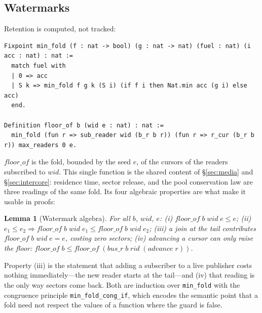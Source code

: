 \documentclass[10pt,journal,compsoc,twocolumn]{article}
\newtheorem{lemma}[theorem]{Lemma}
\theoremstyle{definition}
\theoremstyle{remark}
\theoremstyle{plain}
\newcommand{\ctr}[1]{\texttt{#1}}
\begin{document}
\subsection{Watermarks}
\label{sec:watermark}
Retention is computed, not tracked:
\begin{lstlisting}[language=Coq]
Fixpoint min_fold (f : nat -> bool) (g : nat -> nat) (fuel : nat) (i acc : nat) : nat :=
  match fuel with
  | 0 => acc
  | S k => min_fold f g k (S i) (if f i then Nat.min acc (g i) else acc)
  end.

Definition floor_of b (wid e : nat) : nat :=
  min_fold (fun r => sub_reader wid (b_r b r)) (fun r => r_cur (b_r b r)) max_readers 0 e.
\end{lstlisting}
\(\mathit{floor\_of}\) is the fold, bounded by the seed \(e\), of the cursors of the readers subscribed to \(\mathit{wid}\). This single function is the shared content of \S\ref{sec:media} and \S\ref{sec:intercore}: residence time, sector release, and the pool conservation law are three readings of the same fold. Its four algebraic properties are what make it usable in proofs:
\begin{lemma}[Watermark algebra]
\label{lem:watermark}
For all \(b\), \(\mathit{wid}\), \(e\):
\textup{(i)} \(\mathit{floor\_of}\;b\;\mathit{wid}\;e \le e\);
\textup{(ii)} \(e_1 \le e_2 \Rightarrow \mathit{floor\_of}\;b\;\mathit{wid}\;e_1 \le \mathit{floor\_of}\;b\;\mathit{wid}\;e_2\);
\textup{(iii)} a join at the tail contributes \(\mathit{floor\_of}\;b\;\mathit{wid}\;e = e\), costing zero sectors;
\textup{(iv)} advancing a cursor can only raise the floor: \(\mathit{floor\_of}\;b \le \mathit{floor\_of}\;(\mathit{bus\_r}\;b\;\mathit{rid}\;(\mathit{advance}\;\mathit{r}))\).
\end{lemma}
Property (iii) is the statement that adding a subscriber to a live publisher costs nothing immediately---the new reader starts at the tail---and (iv) that reading is the only way sectors come back. Both are induction over \ctr{min\_fold} with the congruence principle \ctr{min\_fold\_cong\_if}, which encodes the semantic point that a fold need not respect the values of a function where the guard is false.
\end{document}

